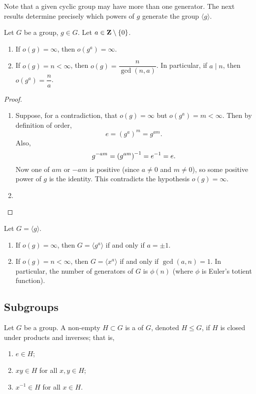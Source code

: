 Note that a given cyclic group may have more than one generator. The next results determine precisely which powers of $g$ generate the group $\langle g\rangle$.

\begin{proposition}
Let $G$ be a group, $g\in G$. Let $a\in\mathbf Z\setminus\{0\}$.
\begin{enumerate}[label=(\roman*)]
\item If $o(g)=\infty$, then $o(g^a)=\infty$.
\item If $o(g)=n<\infty$, then $o(g)=\dfrac{n}{\gcd(n,a)}$. In particular, if $a\mid n$, then $o(g^a)=\dfrac{n}{a}$.
\end{enumerate}
\end{proposition}

\begin{proof} \
\begin{enumerate}[label=(\roman*)]
\item Suppose, for a contradiction, that $o(g)=\infty$ but $o(g^a)=m<\infty$. Then by definition of order,
\[e=(g^a)^m=g^{am}.\]
Also,
\[g^{-am}=\left(g^{am}\right)^{-1}=e^{-1}=e.\]
Now one of $am$ or $-am$ is positive (since $a\neq0$ and $m\neq0$), so some positive power of $g$ is the identity. This contradicts the hypothesis $o(g)=\infty$.

\item 
\end{enumerate}
\end{proof}

\begin{proposition}
Let $G=\langle g\rangle$.
\begin{enumerate}[label=(\roman*)]
\item If $o(g)=\infty$, then $G=\langle g^a\rangle$ if and only if $a=\pm1$.
\item If $o(g)=n<\infty$, then $G=\langle x^a\rangle$ if and only if $\gcd(a,n)=1$. In particular, the number of generators of $G$ is $\phi(n)$ (where $\phi$ is Euler's totient function).
\end{enumerate}
\end{proposition}

\subsection{Subgroups}
\begin{definition}[Subgroup]
Let $G$ be a group. A non-empty $H\subset G$ is a  of $G$, denoted $H\le G$, if $H$ is closed under products and inverses; that is,
\begin{enumerate}[label=(\roman*)]
\item $e\in H$;
\item $xy\in H$ for all $x,y\in H$;
\item $x^{-1}\in H$ for all $x\in H$.
\end{enumerate}
\end{definition}


